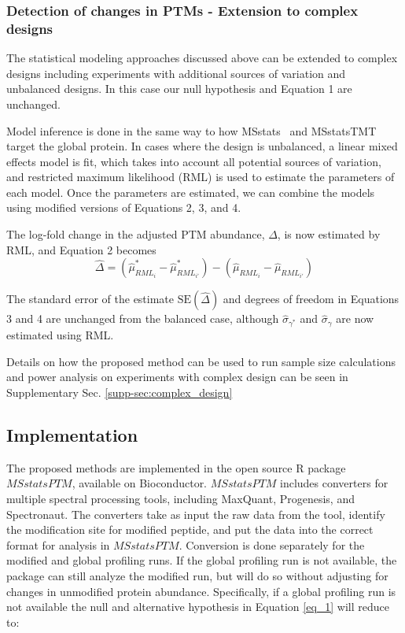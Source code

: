 \documentclass[mcp]{article}
\numberwithin{table}{section}
\begin{document}
\subsubsection*{Detection of changes in PTMs - Extension to complex designs}

The statistical modeling approaches discussed above can be extended to complex designs including experiments with additional sources of variation and unbalanced designs. In this case our null hypothesis and Equation 1 are unchanged.

Model inference is done in the same way to how MSstats~\cite{Choi:2014} and MSstatsTMT~\cite{Huang:2020} target the global protein. In cases where the design is unbalanced, a linear mixed effects model is fit, which takes into account all potential sources of variation, and restricted maximum likelihood (RML) is used to estimate the parameters of each model. Once the parameters are estimated, we can combine the models using modified versions of Equations 2, 3, and 4.

The log-fold change in the adjusted PTM abundance, $\Delta$, is now estimated by RML, and Equation 2 becomes 
\begin{equation}
\hat{\Delta} = (\hat{\mu}_{RML_i}^{\ast} - \hat{\mu}_{RML_{i'}}^{\ast}) - (\hat{\mu}_{RML_i} - \hat{\mu}_{RML_{i'}})
\end{equation}

The standard error of the estimate $\mathrm{SE}(\hat{\Delta})$ and degrees of freedom in Equations 3 and 4 are unchanged from the balanced case, although $\hat{\sigma}_{\gamma^\ast}$ and $\hat{\sigma}_{\gamma}$ are now estimated using RML.

Details on how the proposed method can be used to run sample size calculations and power analysis on experiments with complex design can be seen in Supplementary Sec. \ref{supp-sec:complex_design}

\subsection*{Implementation}

The proposed methods are implemented in the open source R package $MSstatsPTM$, available on Bioconductor. $MSstatsPTM$ includes converters for multiple spectral processing tools, including MaxQuant, Progenesis, and Spectronaut. The converters take as input the raw data from the tool, identify the modification site for modified peptide, and put the data into the correct format for analysis in $MSstatsPTM$. Conversion is done separately for the modified and global profiling runs. If the global profiling run is not available, the package can still analyze the modified run, but will do so without adjusting for changes in unmodified protein abundance. Specifically, if a global profiling run is not available the null and alternative hypothesis in Equation \ref{eq_1} will reduce to:
\end{document}
